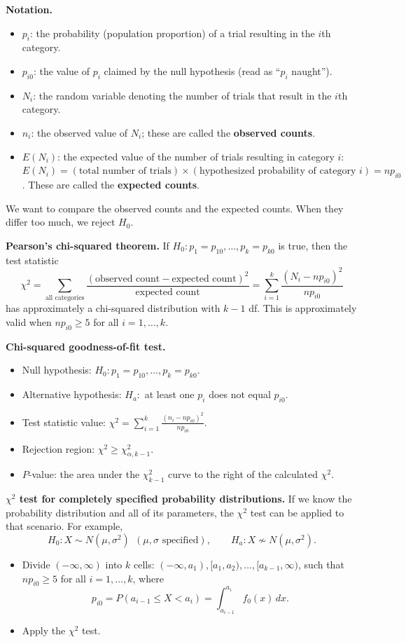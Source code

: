 \textbf{Notation.}
\begin{itemize}
  \item $p_i$: the probability (population proportion) of a trial resulting in the $i$th category.
  \item $p_{i0}$: the value of $p_i$ claimed by the null hypothesis (read as ``$p_i$ naught'').
  \item $N_i$: the random variable denoting the number of trials that result in the $i$th category.
  \item $n_i$: the observed value of $N_i$; these are called the \textbf{observed counts}.
  \item $E(N_i)$: the expected value of the number of trials resulting in category $i$:
  $E(N_i) = (\text{total number of trials})\times(\text{hypothesized probability of category } i) = np_{i0}$.
  These are called the \textbf{expected counts}.
\end{itemize}
We want to compare the observed counts and the expected counts. When they differ too much, we reject $H_0$.

\textbf{Pearson's chi-squared theorem.} If $H_0:p_1=p_{10},\dots,p_k=p_{k0}$ is true, then the test statistic
\[
\chi^2 = \sum_{\text{all categories}} \frac{(\text{observed count}-\text{expected count})^2}{\text{expected count}}
 = \sum_{i=1}^k \frac{(N_i-np_{i0})^2}{np_{i0}}
\]
has approximately a chi-squared distribution with $k-1$ df. This is approximately valid when $np_{i0}\ge5$ for all $i=1,\dots,k$.

\textbf{Chi-squared goodness-of-fit test.}
\begin{itemize}
  \item Null hypothesis: $H_0:p_1=p_{10},\dots,p_k=p_{k0}$.
  \item Alternative hypothesis: $H_a:$ at least one $p_i$ does not equal $p_{i0}$.
  \item Test statistic value: $\displaystyle\chi^2=\sum_{i=1}^k\frac{(n_i-np_{i0})^2}{np_{i0}}$.
  \item Rejection region: $\chi^2\ge\chi^2_{\alpha,k-1}$.
  \item $P$-value: the area under the $\chi^2_{k-1}$ curve to the right of the calculated $\chi^2$.
\end{itemize}

\textbf{$\chi^2$ test for completely specified probability distributions.}
If we know the probability distribution and all of its parameters, the $\chi^2$ test can be applied to that scenario.
For example,
\[
H_0: X\sim N(\mu,\sigma^2)\ \ (\mu,\sigma \text{ specified}),\qquad H_a: X\not\sim N(\mu,\sigma^2).
\]
\begin{itemize}
  \item Divide $(-\infty,\infty)$ into $k$ cells: $(-\infty,a_1),[a_1,a_2),\dots,[a_{k-1},\infty)$, such that $np_{i0}\ge5$ for all $i=1,\dots,k$, where
  \[
  p_{i0}=P(a_{i-1}\le X<a_i)=\int_{a_{i-1}}^{a_i} f_0(x)\,dx .
  \]
  \item Apply the $\chi^2$ test.
\end{itemize}

